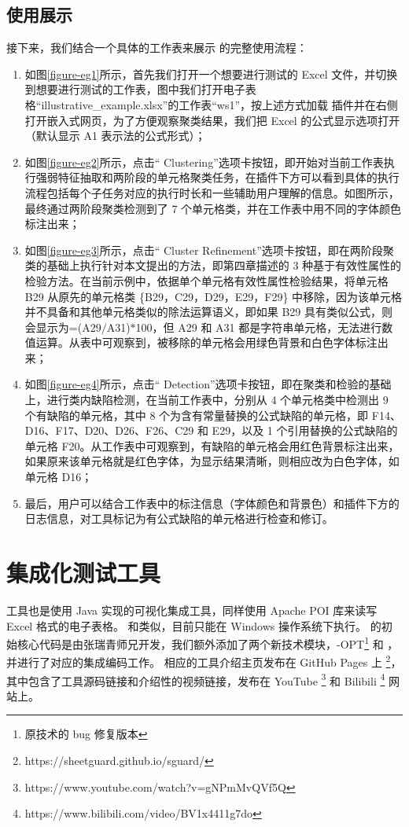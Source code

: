 \subsection{使用展示}
接下来，我们结合一个具体的工作表来展示 \eg 的完整使用流程：
\begin{enumerate}
    \item 如图\ref{figure-eg1}所示，首先我们打开一个想要进行测试的 Excel 文件，并切换到想要进行测试的工作表，图中我们打开电子表格“illustrative\_example.xlsx”的工作表“ws1”，按上述方式加载 \eg 插件并在右侧打开嵌入式网页，为了方便观察聚类结果，我们把 Excel 的公式显示选项打开（默认显示 A1 表示法的公式形式）；
    
    \item 如图\ref{figure-eg2}所示，点击“ Clustering”选项卡按钮，即开始对当前工作表执行强弱特征抽取和两阶段的单元格聚类任务，在插件下方可以看到具体的执行流程包括每个子任务对应的执行时长和一些辅助用户理解的信息。如图所示，最终通过两阶段聚类检测到了 7 个单元格类，并在工作表中用不同的字体颜色标注出来；
    
    \item 如图\ref{figure-eg3}所示，点击“ Cluster Refinement”选项卡按钮，即在两阶段聚类的基础上执行针对本文提出的\wa 方法，即第四章描述的 3 种基于有效性属性的检验方法。在当前示例中，依据单个单元格有效性属性检验结果，将单元格 B29 从原先的单元格类 \{B29，C29，D29，E29，F29\} 中移除，因为该单元格并不具备和其他单元格类似的除法运算语义，即如果 B29 具有类似公式，则会显示为=(A29$/$A31)$*$100，但 A29 和 A31 都是字符串单元格，无法进行数值运算。从表中可观察到，被移除的单元格会用绿色背景和白色字体标注出来；
    
    \item 如图\ref{figure-eg4}所示，点击“ Detection”选项卡按钮，即在聚类和检验的基础上，进行类内缺陷检测，在当前工作表中，分别从 4 个单元格类中检测出 9 个有缺陷的单元格，其中 8 个为含有常量替换的公式缺陷的单元格，即 F14、D16、F17、D20、D26、F26、C29 和 E29，以及 1 个引用替换的公式缺陷的单元格 F20。从工作表中可观察到，有缺陷的单元格会用红色背景标注出来，如果原来该单元格就是红色字体，为显示结果清晰，则相应改为白色字体，如单元格 D16；
    
    \item 最后，用户可以结合工作表中的标注信息（字体颜色和背景色）和插件下方的日志信息，对工具标记为有公式缺陷的单元格进行检查和修订。
\end{enumerate}


\section{\sg 集成化测试工具}
\sg 工具也是使用 Java 实现的可视化集成工具，同样使用 Apache POI 库来读写 Excel 格式的电子表格。
和\wa 类似，目前只能在 Windows 操作系统下执行。
\sg 的初始核心代码是由张瑞青师兄开发，我们额外添加了两个新技术模块，\cu-OPT\footnote{原\cu 技术的 bug 修复版本} 和 \wa ，并进行了对应的集成编码工作。
相应的工具介绍主页发布在 GitHub Pages 上 \footnote{https://sheetguard.github.io/sguard/}，其中包含了工具源码链接和介绍性的视频链接，发布在 YouTube \footnote{https://www.youtube.com/watch?v=gNPmMvQVf5Q} 和 Bilibili \footnote{https://www.bilibili.com/video/BV1x4411g7do} 网站上。

